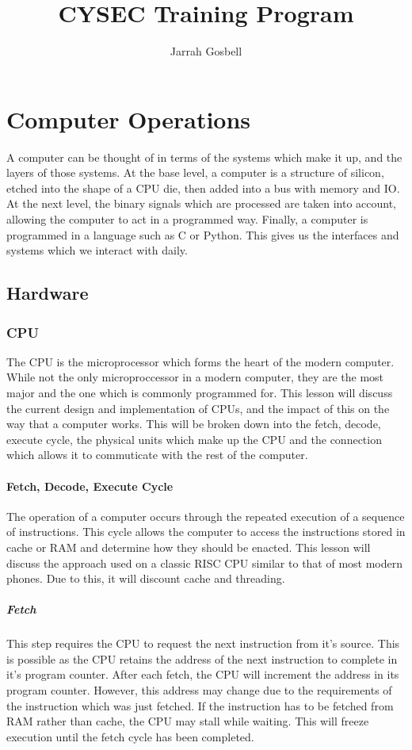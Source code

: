 \documentclass[a4paper,11pt]{book}
\author{Jarrah Gosbell}
\title{CYSEC Training Program}
\begin{document}
\maketitle
\tableofcontents
\newpage
\chapter{Computer Operations}
	A computer can be thought of in terms of the systems which make it up, and the layers of those systems.
	At the base level, a computer is a structure of silicon, etched into the shape of a CPU die, then added into a bus with memory and IO.
	At the next level, the binary signals which are processed are taken into account, allowing the computer to act in a programmed way. 
	Finally, a computer is programmed in a language such as C or Python. This gives us the interfaces and systems which we interact with daily. 
	\section{Hardware}
		\subsection{CPU} 
			The CPU is the microprocessor which forms the heart of the modern computer. 
			While not the only microproccessor in a modern computer, they are the most major and the one which is commonly programmed for. 
			This lesson will discuss the current design and implementation of CPUs, and the impact of this on the way that a computer works. 
			This will be broken down into the fetch, decode, execute cycle, the physical units which make up the CPU and the connection which allows it to commuticate with the rest of the computer. 
			\subsubsection{Fetch, Decode, Execute Cycle}
				The operation of a computer occurs through the repeated execution of a sequence of instructions.
				This cycle allows the computer to access the instructions stored in cache or RAM and determine how they should be enacted. This lesson will discuss the approach used on a classic RISC CPU similar to that of most modern phones. 
				Due to this, it will discount cache and threading. 
				\paragraph{Fetch}
					This step requires the CPU to request the next instruction from it's source. 
					This is possible as the CPU retains the address of the next instruction to complete in it's program counter. 
					After each fetch, the CPU will increment the address in its program counter. 
					However, this address may change due to the requirements of the instruction which was just fetched. 
					If the instruction has to be fetched from RAM rather than cache, the CPU may stall while waiting.
					This will freeze execution until the fetch cycle has been completed. 
\end{document}
